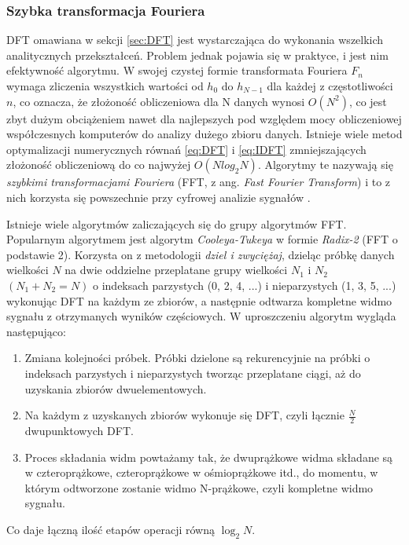 \documentclass[12pt,a4paper,twoside]{mwart}
\begin{document}
\subsubsection{Szybka transformacja Fouriera} \label{sec:FFT}
DFT omawiana w sekcji \ref{sec:DFT} jest wystarczająca do wykonania wszelkich analitycznych przekształceń. Problem jednak pojawia się w praktyce, i jest nim efektywność algorytmu. W swojej czystej formie transformata Fouriera $F_n$ wymaga zliczenia wszystkich wartości od $h_0$ do $h_{N-1}$ dla każdej z częstotliwości $n$, co oznacza, że złożoność obliczeniowa dla N danych wynosi $O(N^2)$, co jest zbyt dużym obciążeniem nawet dla najlepszych pod względem mocy obliczeniowej współczesnych komputerów do analizy dużego zbioru danych. Istnieje wiele metod optymalizacji numerycznych równań \ref{eq:DFT} i \ref{eq:IDFT} zmniejszających złożoność obliczeniową do co najwyżej $O(N log_2 N)$. Algorytmy te nazywają się \textit{szybkimi transformacjami Fouriera} (FFT, z ang. \textit{Fast Fourier Transform}) i to z nich korzysta się powszechnie przy cyfrowej analizie sygnałów \cite{Transcription:Tukey:FFT}.

Istnieje wiele algorytmów zaliczających się do grupy algorytmów FFT. Popularnym algorytmem jest algorytm \textit{Cooleya-Tukeya} w formie \textit{Radix-2} (FFT o podstawie 2). Korzysta on z metodologii \textit{dziel i zwyciężaj}, dzieląc próbkę danych wielkości $N$ na dwie oddzielne przeplatane grupy wielkości $N_1$ i $N_2$ $(N_1 + N_2 = N)$ o indeksach parzystych (0, 2, 4, ...) i nieparzystych (1, 3, 5, ...) wykonując DFT na każdym ze zbiorów, a następnie odtwarza kompletne widmo sygnału z otrzymanych wyników częściowych. W uproszczeniu algorytm wygląda następująco:
\begin{enumerate}
  \item{Zmiana kolejności próbek. Próbki dzielone są rekurencyjnie na próbki o indeksach parzystych i nieparzystych tworząc przeplatane ciągi, aż do uzyskania zbiorów dwuelementowych.}
  \item{Na każdym z uzyskanych zbiorów wykonuje się DFT, czyli łącznie $\frac{N}{2}$ dwupunktowych DFT.}
  \item{Proces składania widm powtażamy tak, że dwuprążkowe widma składane są w czteroprążkowe, czteroprążkowe w ośmioprążkowe itd., do momentu, w którym odtworzone zostanie widmo N-prążkowe, czyli kompletne widmo sygnału.}
\end{enumerate}
Co daje łączną ilość etapów operacji równą $\log_2 N$. \cite[241-252]{CyfrowePrzetwarzanieSygnalowOdTeoriiDoZastosowan}
\end{document}
